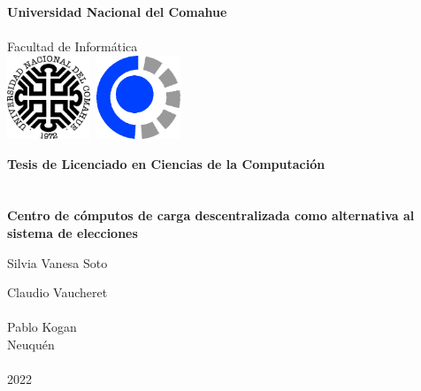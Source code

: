 
\titlepage

\begin{center}
\ \\
\ \\
\vspace{-1cm}
 

\ \\

\vspace{0.5cm}
{\Large{\bf \sc Universidad Nacional del Comahue}}\\

\ \\
{\Large { \sc Facultad de Informática}}\\

\vspace{-2.5cm}
\mbox{\hspace{-1cm}\includegraphics[width=2.5cm,height=2.5cm]{img/unc.png}\hspace{13cm} \includegraphics[width=2.5cm,height=2.5cm]{img/fai.png}}


\vspace{6cm}

{\Large {\bf\sc Tesis de Licenciado en Ciencias de la Computaci\'on}}\\
\ \\
\ \\
{\LARGE {\bf Centro de cómputos de carga descentralizada como alternativa al sistema de elecciones}}\\
\vspace{3cm}


{\Large Silvia Vanesa Soto}\\
\vspace{2cm}

{\Large Claudio Vaucheret}\\
\ \\
{\Large Pablo Kogan}\\

\vfill
{\Large {\sc Neuqu\'en}\hspace{6cm}{\sc Argentina}}\\
\ \\

{\Large 2022}\\

\end{center}

\pagebreak

